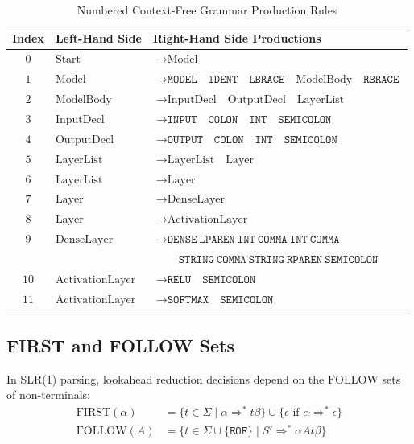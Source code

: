 \documentclass[11pt,a4paper]{article}
\begin{document}
\begin{table}[htbp]
\centering
\small
\caption{Numbered Context-Free Grammar Production Rules}
\label{tab:cfg_productions}
\begin{tabular}{cll}
\toprule
\textbf{Index} & \textbf{Left-Hand Side} & \textbf{Right-Hand Side Productions} \\
\midrule
$0$  & $\text{Start}$           & $\rightarrow \text{Model}$ \\
$1$  & $\text{Model}$           & $\rightarrow \texttt{MODEL} \quad \texttt{IDENT} \quad \texttt{LBRACE} \quad \text{ModelBody} \quad \texttt{RBRACE}$ \\
$2$  & $\text{ModelBody}$       & $\rightarrow \text{InputDecl} \quad \text{OutputDecl} \quad \text{LayerList}$ \\
$3$  & $\text{InputDecl}$       & $\rightarrow \texttt{INPUT} \quad \texttt{COLON} \quad \texttt{INT} \quad \texttt{SEMICOLON}$ \\
$4$  & $\text{OutputDecl}$      & $\rightarrow \texttt{OUTPUT} \quad \texttt{COLON} \quad \texttt{INT} \quad \texttt{SEMICOLON}$ \\
$5$  & $\text{LayerList}$       & $\rightarrow \text{LayerList} \quad \text{Layer}$ \\
$6$  & $\text{LayerList}$       & $\rightarrow \text{Layer}$ \\
$7$  & $\text{Layer}$           & $\rightarrow \text{DenseLayer}$ \\
$8$  & $\text{Layer}$           & $\rightarrow \text{ActivationLayer}$ \\
$9$  & $\text{DenseLayer}$      & $\rightarrow \texttt{DENSE} \ \texttt{LPAREN} \ \texttt{INT} \ \texttt{COMMA} \ \texttt{INT} \ \texttt{COMMA}$ \\
     &                          & $\phantom{\rightarrow} \quad \texttt{STRING} \ \texttt{COMMA} \ \texttt{STRING} \ \texttt{RPAREN} \ \texttt{SEMICOLON}$ \\
$10$ & $\text{ActivationLayer}$ & $\rightarrow \texttt{RELU} \quad \texttt{SEMICOLON}$ \\
$11$ & $\text{ActivationLayer}$ & $\rightarrow \texttt{SOFTMAX} \quad \texttt{SEMICOLON}$ \\
\bottomrule
\end{tabular}
\end{table}

\subsection{FIRST and FOLLOW Sets}
In SLR(1) parsing, lookahead reduction decisions depend on the $\text{FOLLOW}$ sets of non-terminals:
\begin{align}
    \text{FIRST}(\alpha) &= \{ t \in \Sigma \mid \alpha \Rightarrow^* t\beta \} \cup \{ \epsilon \text{ if } \alpha \Rightarrow^* \epsilon \} \\
    \text{FOLLOW}(A)    &= \{ t \in \Sigma \cup \{\texttt{EOF}\} \mid S' \Rightarrow^* \alpha A t \beta \}
\end{align}
\end{document}
